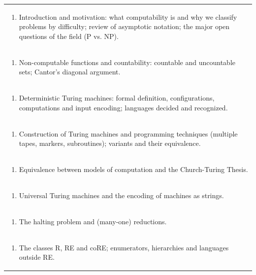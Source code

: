 \documentclass[11pt]{article}
\begin{document}
\begin{center}
\begin{longtable}{|p{4cm}|p{4cm}|p{4cm}|p{4cm}|}
\multicolumn{4}{|p{\dimexpr 16cm + 6\tabcolsep\relax}|}{\begin{enumerate}[start=1]\item Introduction and motivation: what computability is and why we classify problems by difficulty; review of asymptotic notation; the major open questions of the field (P vs. NP).\end{enumerate}}\\
\multicolumn{4}{|p{\dimexpr 16cm + 6\tabcolsep\relax}|}{\begin{enumerate}[start=2]\item Non-computable functions and countability: countable and uncountable sets; Cantor's diagonal argument.\end{enumerate}}\\
\multicolumn{4}{|p{\dimexpr 16cm + 6\tabcolsep\relax}|}{\begin{enumerate}[start=3]\item Deterministic Turing machines: formal definition, configurations, computations and input encoding; languages decided and recognized.\end{enumerate}}\\
\multicolumn{4}{|p{\dimexpr 16cm + 6\tabcolsep\relax}|}{\begin{enumerate}[start=4]\item Construction of Turing machines and programming techniques (multiple tapes, markers, subroutines); variants and their equivalence.\end{enumerate}}\\
\multicolumn{4}{|p{\dimexpr 16cm + 6\tabcolsep\relax}|}{\begin{enumerate}[start=5]\item Equivalence between models of computation and the Church-Turing Thesis.\end{enumerate}}\\
\multicolumn{4}{|p{\dimexpr 16cm + 6\tabcolsep\relax}|}{\begin{enumerate}[start=6]\item Universal Turing machines and the encoding of machines as strings.\end{enumerate}}\\
\multicolumn{4}{|p{\dimexpr 16cm + 6\tabcolsep\relax}|}{\begin{enumerate}[start=7]\item The halting problem and (many-one) reductions.\end{enumerate}}\\
\multicolumn{4}{|p{\dimexpr 16cm + 6\tabcolsep\relax}|}{\begin{enumerate}[start=8]\item The classes R, RE and coRE; enumerators, hierarchies and languages outside RE.\end{enumerate}}\\

\end{longtable}
\end{center}
\end{document}

